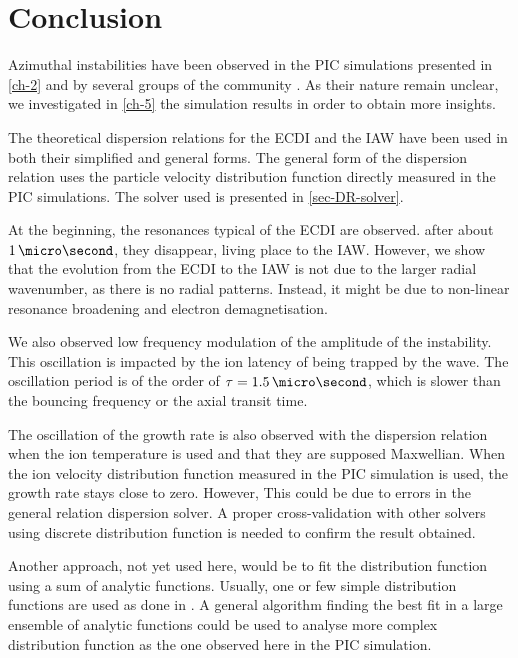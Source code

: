 
\section{Conclusion}
  Azimuthal instabilities have been observed in the \ac{PIC} simulations presented in \cref{ch-2} and by several groups of the community \citep{hara2019a,janhunen2018,taccogna2019}.
  As their nature remain unclear, we investigated in \cref{ch-5} the simulation results in order to obtain more insights.
  
  The theoretical dispersion relations for the \ac{ECDI} and the \ac{IAW} have been used in both their simplified and general forms.
  The general form of the dispersion relation uses the particle velocity distribution function directly measured in the \ac{PIC} simulations.
  The solver used is presented in \cref{sec-DR-solver}.
  
  At the beginning, the resonances typical of the \ac{ECDI} are observed.
  after about $1\,\micro\second$, they disappear, living place to the \ac{IAW}.
  However, we show that the evolution from the \ac{ECDI} to the \ac{IAW}  is not due to the larger radial wavenumber, as there is no radial patterns.
  Instead, it might be due to non-linear resonance broadening and electron demagnetisation.
  
  \vspace{1ex}
  We also observed low frequency modulation of the amplitude of the instability.
  This oscillation is impacted by the ion latency of being trapped by the wave.
  The oscillation period is of the order of $\tau=1.5\,\micro\second$, which is slower than the bouncing frequency or the axial transit time.
  
  The oscillation of the growth rate is also observed with the dispersion relation when the ion temperature is used and that they are supposed Maxwellian.
  When the ion velocity distribution function measured in the \ac{PIC}  simulation is used, the growth rate stays close to zero.
  However, This could be due to errors in the general relation dispersion solver.
  A proper cross-validation with other solvers using discrete distribution function is needed to confirm the result obtained.
  
  Another approach, not yet used here, would be to fit the distribution function using a sum of analytic functions.
  Usually, one or few simple distribution functions are used as done in \citet{ronnmark1982}.
  A general algorithm finding the best fit in a large ensemble of analytic functions could be used to analyse more complex distribution function as the one observed here in the PIC simulation.

